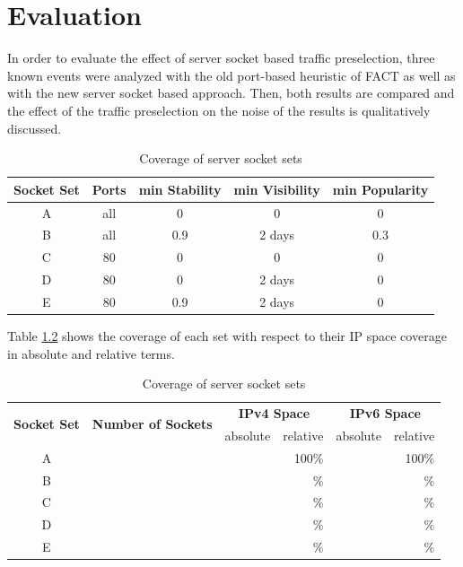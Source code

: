 

\chapter{Evaluation\label{chapter:results}}

In order to evaluate the effect of server socket based traffic preselection, three known events were analyzed with the old port-based heuristic of FACT as well as with the new server socket based approach. Then, both results are compared and the effect of the traffic preselection on the noise of the results is qualitatively discussed.


\begin{table}
	[ht] \centering 
	\begin{tabular}
		{|c|c|c|c|c|} \hline \textbf{Socket Set} & \textbf{Ports} & \textbf{min Stability} & \textbf{min Visibility} & \textbf{min Popularity} \\
		\hline 
		\hline A & all & 0 & 0 & 0\\
		\hline B & all & 0.9 & 2 days & 0.3 \\
		\hline C & 80 & 0 & 0 & 0 \\
		\hline D & 80 & 0 & 2 days & 0 \\
		\hline E & 80 & 0.9 & 2 days & 0 \\
		\hline 
	\end{tabular}
	\caption{Coverage of server socket sets}
	\label{tab:ses_sets}
\end{table}

Table \ref{tab:ses_sets_coverage} shows the coverage of each set with respect to their IP space coverage in absolute and relative terms. 

\begin{table}
	[ht] \centering 
	\begin{tabular}
		{|c|c|r|r|r|r|} \hline \multirow{2}{*}{\textbf{Socket Set}} & \multirow{2}{*}{\textbf{Number of Sockets}} & \multicolumn{2}{|c|}{\textbf{IPv4 Space}} & \multicolumn{2}{|c|}{\textbf{IPv6 Space}} \\
		\cline{3-6} & & absolute & relative & absolute & relative \\
		\hline 
		\hline A &  &  & 100\% 	& & 100\% \\
		\hline B &  &  & \% 	& & \% \\
		\hline C &  &  & \% 	& & \% \\
		\hline D &  &  & \% 	& & \% \\
		\hline E &  &  & \% 	& & \% \\
		\hline 
	\end{tabular}
	\caption{Coverage of server socket sets}
	\label{tab:ses_sets_coverage}
\end{table}

